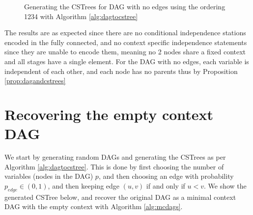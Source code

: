 \documentclass{tufte-book}
\begin{document}
\begin{figure}[!h]\label{fig:dagtocstree_cstree}
   \begin{floatrow}
%
\caption{Generating the CSTrees for DAG with no edges using the ordering 1234 with Algorithm \ref{alg:dagtocstree}}
        
   \end{floatrow}
\end{figure}

The results are as expected since there are no conditional independence stations encoded in the fully connected, and no context specific independence statements since they are unable to encode them, meaning no 2 nodes share a fixed context and all stages have a single element. For the DAG with no edges, each variable is independent of each other, and each node has no parents thus by Proposition \ref{prop:dagandcstrees}

\section{Recovering the empty context DAG}
\label{sec:org034a010}
We start by generating random DAGs and generating the CSTrees as per Algorithm \ref{alg:dagtocstree}. This is done by first choosing the number of variables (nodes in the DAG) \(p\), and then choosing an edge with probability \(p_{edge} \in (0,1)\), and then keeping edge \((u,v)\) if and only if \(u<v\). We show the generated CSTree below, and recover the original DAG as a minimal context DAG with the empty context with Algorithm \ref{alg:mcdags}.
\end{document}
